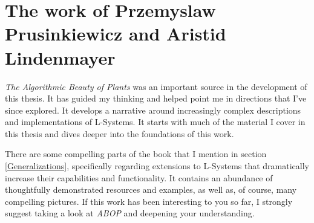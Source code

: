 \documentclass[12pt,twoside]{reedthesis}
\begin{document}
\section{The work of Przemyslaw Prusinkiewicz and Aristid Lindenmayer}
	
	\textit{The Algorithmic Beauty of Plants} was an important source in the development of this thesis. It has guided my thinking and helped point me in directions that I've since explored. It develops a narrative around increasingly complex descriptions and implementations of L-Systems. It starts with much of the material I cover in this thesis and dives deeper into the foundations of this work.
	
	There are some compelling parts of the book that I mention in section \ref{Generalizations}, specifically regarding extensions to L-Systems that dramatically increase their capabilities and functionality. It contains an abundance of thoughtfully demonstrated resources and examples, as well as, of course, many compelling pictures. If this work has been interesting to you so far, I strongly suggest taking a look at \textit{ABOP} and deepening your understanding.
	
\end{document}
